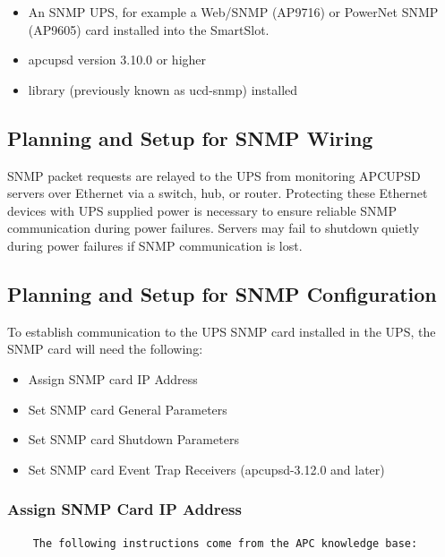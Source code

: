 {{{{{{{\begin{itemize}
\item An SNMP UPS, for example a Web/SNMP (AP9716) or PowerNet SNMP (AP9605)
card installed into the SmartSlot.  
\item apcupsd version 3.10.0 or higher  
\item 
    library (previously known as
   ucd-snmp) installed 
\end{itemize}

\label{Planning-SNMP-Setup-Wiring}

\subsection*{Planning and Setup for SNMP Wiring}

\label{index-SNMP_002d-Wiring-163}
SNMP packet requests are relayed to the UPS from monitoring APCUPSD servers over
Ethernet via a switch, hub, or router.  Protecting these Ethernet devices
with UPS supplied power is necessary to ensure reliable SNMP communication
during power failures.   Servers may fail to shutdown quietly during power failures
if SNMP communication is lost.

\label{Planning-SNMP-Setup-Configuration}

\subsection*{Planning and Setup for SNMP Configuration}
To establish communication to the UPS SNMP card installed in the UPS, the
SNMP card will need the following:
\begin{itemize}
\item Assign SNMP card IP Address
\item Set SNMP card General Parameters
\item Set SNMP card Shutdown Parameters
\item Set SNMP card Event Trap Receivers (apcupsd-3.12.0 and later)
\end{itemize}

\subsubsection*{Assign SNMP Card IP Address}
\footnotesize
\begin{verbatim}
  	The following instructions come from the APC knowledge base:   
\end{verbatim}

}}}}}}}
